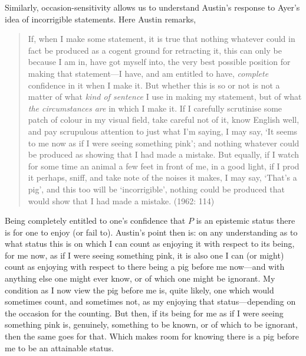Similarly, occasion-sensitivity allows us to understand Austin’s response to Ayer’s idea of incorrigible statements. Here Austin remarks,
\begin{quote}
	If, when I make some statement, it is true that nothing whatever could in fact be produced as a cogent ground for retracting it, this can only be because I am in, have got myself into, the very best possible position for making that statement—I have, and am entitled to have, \emph{complete} confidence in it when I make it. But whether this is so or not is not a matter of what \emph{kind of sentence} I use in making my statement, but of what \emph{the circumstances are} in which I make it. If I carefully scrutinise some patch of colour in my visual field, take careful not of it, know English well, and pay scrupulous attention to just what I’m saying, I may say, `It seems to me now as if I were seeing something pink'; and nothing whatever could be produced as showing that I had made a mistake. But equally, if I watch for some time an animal a few feet in front of me, in a good light, if I prod it perhaps, sniff, and take note of the noises it makes, I may say, `That’s a pig', and this too will be `incorrigible', nothing could be produced that would show that I had made a mistake. (1962: 114)
\end{quote}
Being completely entitled to one’s confidence that \( P \) is an epistemic status there is for one to enjoy (or fail to). Austin’s point then is: on any understanding as to what status this is on which I can count as enjoying it with respect to its being, for me now, as if I were seeing something pink, it is also one I can (or might) count as enjoying with respect to there being a pig before me now---and with anything else one might ever know, or of which one might be ignorant. My condition as I now view the pig before me is, quite likely, one which would sometimes count, and sometimes not, as my enjoying that status---depending on the occasion for the counting. But then, if its being for me as if I were seeing something pink is, genuinely, something to be known, or of which to be ignorant, then the same goes for that. Which makes room for knowing there is a pig before me to be an attainable status.

